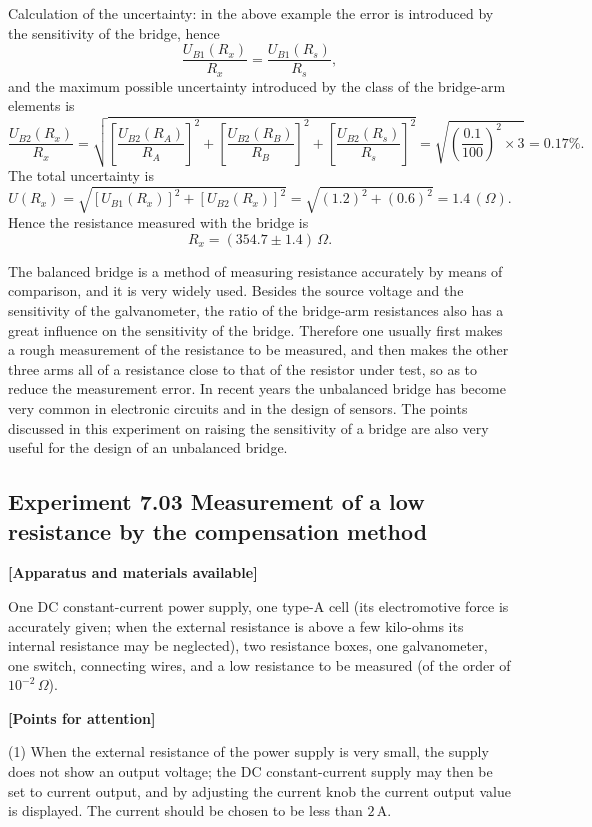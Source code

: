 Calculation of the uncertainty: in the above example the error is introduced by the sensitivity of the bridge, hence
\[
\frac{U_{B1}(R_x)}{R_x}=\frac{U_{B1}(R_s)}{R_s},
\]
and the maximum possible uncertainty introduced by the class of the bridge-arm elements is
\[
\frac{U_{B2}(R_x)}{R_x}=\sqrt{\left[\frac{U_{B2}(R_A)}{R_A}\right]^2+\left[\frac{U_{B2}(R_B)}{R_B}\right]^2+\left[\frac{U_{B2}(R_s)}{R_s}\right]^2}
=\sqrt{\left(\frac{0.1}{100}\right)^2\times 3}=0.17\%.
\]
The total uncertainty is
\[
U(R_x)=\sqrt{\left[U_{B1}(R_x)\right]^2+\left[U_{B2}(R_x)\right]^2}=\sqrt{(1.2)^2+(0.6)^2}=1.4\,(\Omega).
\]
Hence the resistance measured with the bridge is
\[
R_x=(354.7\pm1.4)\,\Omega .
\]

\begin{commentary}
The balanced bridge is a method of measuring resistance accurately by means of comparison, and it is very widely used. Besides the source voltage and the sensitivity of the galvanometer, the ratio of the bridge-arm resistances also has a great influence on the sensitivity of the bridge. Therefore one usually first makes a rough measurement of the resistance to be measured, and then makes the other three arms all of a resistance close to that of the resistor under test, so as to reduce the measurement error. In recent years the unbalanced bridge has become very common in electronic circuits and in the design of sensors. The points discussed in this experiment on raising the sensitivity of a bridge are also very useful for the design of an unbalanced bridge.
\end{commentary}

\subsection*{Experiment 7.03 \quad Measurement of a low resistance by the compensation method}

\textbf{[Apparatus and materials available]}

One DC constant-current power supply, one type-A cell (its electromotive force is accurately given; when the external resistance is above a few kilo-ohms its internal resistance may be neglected), two resistance boxes, one galvanometer, one switch, connecting wires, and a low resistance to be measured (of the order of $10^{-2}\,\Omega$).

\textbf{[Points for attention]}

(1) When the external resistance of the power supply is very small, the supply does not show an output voltage; the DC constant-current supply may then be set to current output, and by adjusting the current knob the current output value is displayed. The current should be chosen to be less than $2\,\mathrm{A}$.

